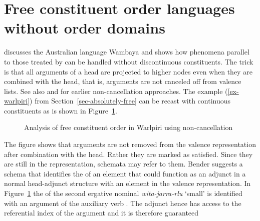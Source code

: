 \documentclass[output=paper]{langsci/langscibook}
\begin{document}
\section{Free constituent order languages without order domains}
\label{sec-free-without-domains}

\citet{Bender2008a} discusses the Australian language Wambaya and shows how phenomena parallel to
those treated by \citet{DS99a} can be handled without discontinuous constituents. The trick is that
all arguments of a head are projected to higher nodes even when they are combined with the head,
that is, arguments are not canceled off from valence lists. See also  and
 for earlier non-cancellation approaches. The example (\ref{ex-warlpiri}) from
Section~\ref{sec-absolutely-free} can be recast with continuous constituents as is shown in
Figure~\ref{fig-warlpiri-non-cancellation}. 
\begin{figure}
\caption{\label{fig-warlpiri-non-cancellation}Analysis of free constituent order in Warlpiri using non-cancellation}
\end{figure}
The figure shows that arguments are not removed from the valence representation after combination
with the head. Rather they are marked as satisfied. Since they are still in the representation,
schemata may refer to them. Bender suggests a schema that identifies the \modv of an element that
could function as an adjunct in a normal head-adjunct structure with an element in the valence
representation. In Figure~\ref{fig-warlpiri-non-cancellation} the \modv of the second ergative
nominal \emph{wita-jarra-rlu} `small' is identified with an argument of the auxiliary verb . The
adjunct hence has access to the referential index of the argument and it is therefore guaranteed
\end{document}
